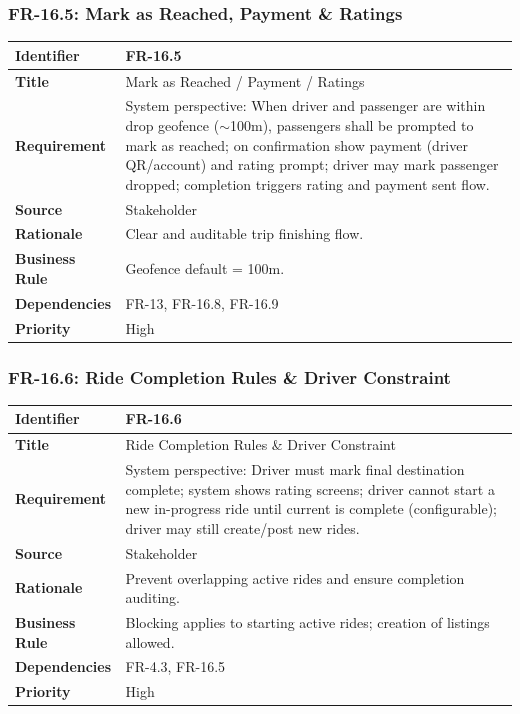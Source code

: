 \subsubsection{FR-16.5: Mark as Reached, Payment \& Ratings}

\begin{longtable}{|p{3cm}|p{12cm}|}
\hline
\rowcolor{lightgray!30}
\textbf{Identifier} & FR-16.5 \\
\hline
\textbf{Title} & Mark as Reached / Payment / Ratings \\
\hline
\textbf{Requirement} & System perspective: When driver and passenger are within drop geofence ($\sim$100m), passengers shall be prompted to mark as reached; on confirmation show payment (driver QR/account) and rating prompt; driver may mark passenger dropped; completion triggers rating and payment sent flow. \\
\hline
\textbf{Source} & Stakeholder \\
\hline
\textbf{Rationale} & Clear and auditable trip finishing flow. \\
\hline
\textbf{Business Rule} & Geofence default = 100m. \\
\hline
\textbf{Dependencies} & FR-13, FR-16.8, FR-16.9 \\
\hline
\textbf{Priority} & High \\
\hline
\end{longtable}

\subsubsection{FR-16.6: Ride Completion Rules \& Driver Constraint}

\begin{longtable}{|p{3cm}|p{12cm}|}
\hline
\rowcolor{lightgray!30}
\textbf{Identifier} & FR-16.6 \\
\hline
\textbf{Title} & Ride Completion Rules \& Driver Constraint \\
\hline
\textbf{Requirement} & System perspective: Driver must mark final destination complete; system shows rating screens; driver cannot start a new in-progress ride until current is complete (configurable); driver may still create/post new rides. \\
\hline
\textbf{Source} & Stakeholder \\
\hline
\textbf{Rationale} & Prevent overlapping active rides and ensure completion auditing. \\
\hline
\textbf{Business Rule} & Blocking applies to starting active rides; creation of listings allowed. \\
\hline
\textbf{Dependencies} & FR-4.3, FR-16.5 \\
\hline
\textbf{Priority} & High \\
\hline
\end{longtable}

